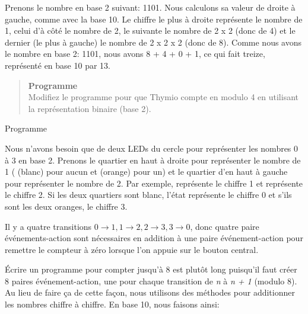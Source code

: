 Prenons le nombre en base 2 suivant: 1101. Nous calculons sa valeur de droite à gauche, comme avec la base 10. Le chiffre le plus à droite représente le nombre de 1, celui d'à côté le nombre de 2, le suivante le nombre de 2 x 2 (donc de 4) et le dernier (le plus à gauche) le nombre de 2 x 2 x 2 (donc de 8). Comme nous avons le nombre en base 2: 1101, nous avons 8 + 4 + 0 + 1, ce qui fait treize, représenté en base 10 par 13.


\begin{quote}
\textbf{Programme}\\
Modifiez le programme pour que Thymio compte en modulo 4 en utilisant la représentation binaire (base 2).
\end{quote}

{\raggedleft \hfill Programme }

Nous n'avons besoin que de deux LEDs du cercle pour représenter les nombres 0 à 3 en base 2. Prenons le quartier en haut à droite pour représenter le nombre de 1 ( (blanc) pour aucun et  (orange) pour un) et le quartier d'en haut à gauche pour représenter le nombre de 2. Par exemple,  représente le chiffre 1 et  représente le chiffre 2. Si les deux quartiers sont blanc, l'état représente le chiffre 0 et s'ils sont les deux oranges, le chiffre 3.

Il y a quatre transitions $0\rightarrow 1, 1\rightarrow 2, 2
\rightarrow 3, 3\rightarrow 0$, donc quatre paire événements-action sont nécessaires en addition à une paire événement-action pour remettre le compteur à zéro lorsque l'on appuie sur le bouton central.


\medskip


\medskip




Écrire un programme pour compter jusqu'à 8 est plutôt long puisqu'il faut créer 8 paires événement-action, une pour chaque transition de \emph{n} à \emph{n + 1} (modulo 8). Au lieu de faire ça de cette façon, nous utilisons des méthodes pour additionner les nombres chiffre à chiffre. En base 10, nous faisons ainsi:

